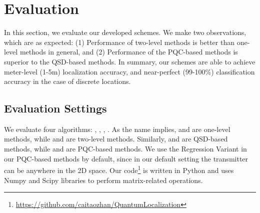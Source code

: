 \section{Evaluation}
\label{sec:quantum_eval}

In this section, we evaluate our developed schemes.
We make two observations, which are as expected:  
(1) Performance of two-level methods is better than one-level methods in general, and 
(2) Performance of the PQC-based methods is superior to the QSD-based methods. 
In summary, our schemes are able to achieve meter-level (1-5m) localization accuracy, and near-perfect (99-100\%) classification accuracy in the case of discrete locations.


\subsection{Evaluation Settings}

We evaluate four algorithms: \povmone, \povm, \pqcone, \pqctwo. As the name implies, \povmone and \pqcone are one-level methods, while \povm and \pqctwo are two-level methods.
Similarly, \povmone and \povm are QSD-based methods, while \pqcone and \pqctwo are PQC-based methods. We use the Regression Variant in our PQC-based methods by default, since in our default setting the transmitter can be anywhere in the 2D space.
Our code\footnote{\url{https://github.com/caitaozhan/QuantumLocalization}} is written in Python and uses Numpy and Scipy libraries to perform matrix-related operations.


